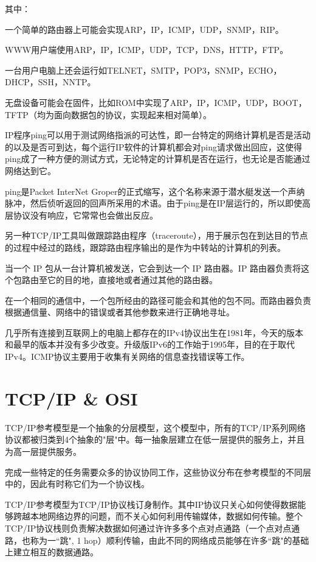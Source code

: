 
其中：

\begin{compactitem}
\item 一个简单的路由器上可能会实现ARP，IP，ICMP，UDP，SNMP，RIP。
\item WWW用户端使用ARP，IP，ICMP，UDP，TCP，DNS，HTTP，FTP。
\item 一台用户电脑上还会运行如TELNET，SMTP，POP3，SNMP，ECHO，DHCP，SSH，NNTP。
\item 无盘设备可能会在固件，比如ROM中实现了ARP，IP，ICMP，UDP，BOOT，TFTP（均为面向数据包的协议，实现起来相对简单）。
\end{compactitem}


IP程序ping可以用于测试网络指派的可达性，即一台特定的网络计算机是否是活动的以及是否可到达，每个运行IP软件的计算机都会对ping请求做出回应，这使得ping成了一种方便的测试方式，无论特定的计算机是否在运行，也无论是否能通过网络达到它。

ping是Packet InterNet Groper的正式缩写，这个名称来源于潜水艇发送一个声纳脉冲，然后侦听返回的回声所采用的术语。由于ping是在IP层运行的，所以即使高层协议没有响应，它常常也会做出反应。

另一种TCP/IP工具叫做跟踪路由程序（traceroute），用于展示包在到达目的节点的过程中经过的路线，跟踪路由程序输出的是作为中转站的计算机的列表。


当一个 IP 包从一台计算机被发送，它会到达一个 IP 路由器。IP 路由器负责将这个包路由至它的目的地，直接地或者通过其他的路由器。

在一个相同的通信中，一个包所经由的路径可能会和其他的包不同。而路由器负责根据通信量、网络中的错误或者其他参数来进行正确地寻址。

几乎所有连接到互联网上的电脑上都存在的IPv4协议出生在1981年，今天的版本和最早的版本并没有多少改变。升级版IPv6的工作始于1995年，目的在于取代IPv4。ICMP协议主要用于收集有关网络的信息查找错误等工作。

\section{TCP/IP \& OSI}

TCP/IP参考模型是一个抽象的分层模型，这个模型中，所有的TCP/IP系列网络协议都被归类到4个抽象的"层"中。每一抽象层建立在低一层提供的服务上，并且为高一层提供服务。

完成一些特定的任务需要众多的协议协同工作，这些协议分布在参考模型的不同层中的，因此有时称它们为一个协议栈。

TCP/IP参考模型为TCP/IP协议栈订身制作。其中IP协议只关心如何使得数据能够跨越本地网络边界的问题，而不关心如何利用传输媒体，数据如何传输。整个TCP/IP协议栈则负责解决数据如何通过许许多多个点对点通路（一个点对点通路，也称为一``跳", 1 hop）顺利传输，由此不同的网络成员能够在许多``跳"的基础上建立相互的数据通路。

